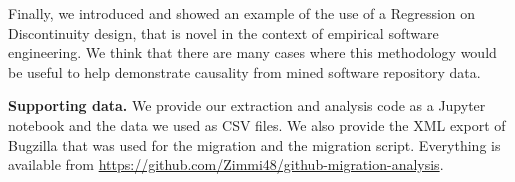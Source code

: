 \documentclass[conference]{IEEEtran}
\begin{document}
Finally, we introduced and showed an example of the use of a Regression on Discontinuity design, that is novel in the context of empirical software engineering. We think that there are many cases where this methodology would be useful to help demonstrate causality from mined software repository data.


\scriptsize
\noindent \footnotesize{\textbf{Supporting data.}}
We provide our extraction and analysis code as a Jupyter notebook and the data we used as CSV files. We also provide the XML export of Bugzilla that was used for the migration and the migration script. Everything is available from \url{https://github.com/Zimmi48/github-migration-analysis}.



%
%
%


%
\end{document}

